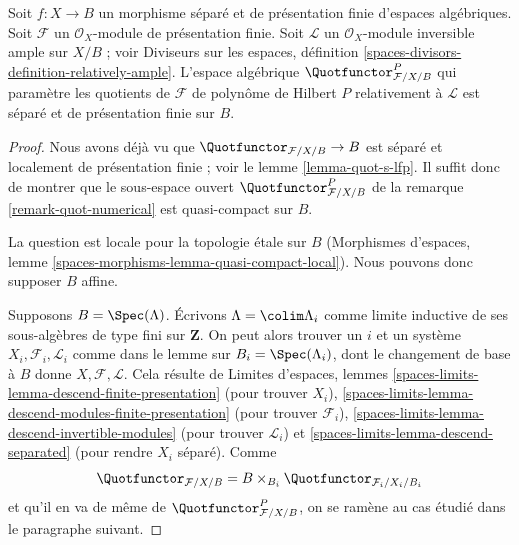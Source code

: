 \begin{lemma}
\label{lemma-quot-qc-over-base}
Soit $f : X \to B$ un morphisme séparé et de présentation finie d'espaces
algébriques. Soit $\mathcal{F}$ un $\mathcal{O}_X$-module de présentation
finie. Soit $\mathcal{L}$ un $\mathcal{O}_X$-module inversible ample sur
$X/B$ ; voir Diviseurs sur les espaces, définition
\ref{spaces-divisors-definition-relatively-ample}.
L'espace algébrique $\Quotfunctor^P_{\mathcal{F}/X/B}$ qui paramètre les
quotients de $\mathcal{F}$ de polynôme de Hilbert $P$ relativement à
$\mathcal{L}$ est séparé et de présentation finie sur $B$.
\end{lemma}

\begin{proof}
Nous avons déjà vu que $\Quotfunctor_{\mathcal{F}/X/B} \to B$ est séparé
et localement de présentation finie ; voir le lemme
\ref{lemma-quot-s-lfp}. Il suffit donc de montrer que le sous-espace ouvert
$\Quotfunctor^P_{\mathcal{F}/X/B}$ de la remarque
\ref{remark-quot-numerical} est quasi-compact sur $B$.

\medskip\noindent
La question est locale pour la topologie \'etale sur $B$
(Morphismes d'espaces, lemme
\ref{spaces-morphisms-lemma-quasi-compact-local}).
Nous pouvons donc supposer $B$ affine.

\medskip\noindent
Supposons $B = \Spec(\Lambda)$. Écrivons
$\Lambda = \colim \Lambda_i$ comme limite inductive de ses sous-algèbres
de type fini sur $\mathbf{Z}$. On peut alors trouver un $i$ et un système
$X_i, \mathcal{F}_i, \mathcal{L}_i$ comme dans le lemme sur
$B_i = \Spec(\Lambda_i)$, dont le changement de base à $B$ donne
$X, \mathcal{F}, \mathcal{L}$. Cela résulte de Limites d'espaces, lemmes
\ref{spaces-limits-lemma-descend-finite-presentation} (pour trouver $X_i$),
\ref{spaces-limits-lemma-descend-modules-finite-presentation} (pour trouver
$\mathcal{F}_i$), \ref{spaces-limits-lemma-descend-invertible-modules}
(pour trouver $\mathcal{L}_i$) et
\ref{spaces-limits-lemma-descend-separated} (pour rendre $X_i$ séparé).
Comme
$$
\Quotfunctor_{\mathcal{F}/X/B} = B \times_{B_i}
\Quotfunctor_{\mathcal{F}_i/X_i/B_i}
$$
et qu'il en va de même de $\Quotfunctor^P_{\mathcal{F}/X/B}$, on se
ramène au cas étudié dans le paragraphe suivant.


\end{proof}
